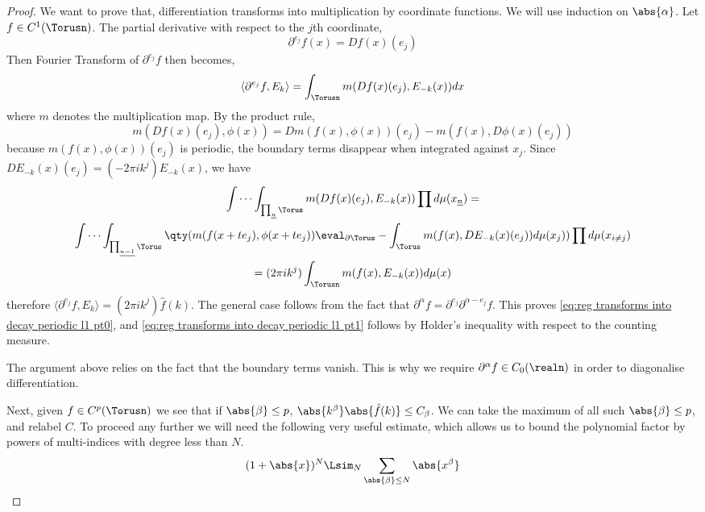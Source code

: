 \documentclass[../main-v2-manifolds.tex]{subfiles}
\begin{document}
\begin{proof}
    We want to prove that, differentiation transforms into multiplication by coordinate functions. We will use induction on $\abs{\alpha}$. Let $f\in C^1(\Torusn)$. The partial derivative with respect to the $j$th coordinate,
    \[
        \partial^{e_j}f(x) = Df(x)(e_j)
    \]
    Then Fourier Transform of $\partial^{e_j}f$ then becomes,
    \[
        \langle \partial^{e_j}f,E_k\rangle = \int_{\Torusn} m(Df(x)(e_j), E_{-k}(x))dx
    \]
    where $m$ denotes the multiplication map. By the product rule,
    \[
        m(Df(x)(e_j), \phi(x)) = Dm(f(x),\phi(x))(e_j) - m(f(x), D\phi(x)(e_j))
    \]
    because $m(f(x), \phi(x))(e_j)$ is periodic, the boundary terms disappear when integrated against $x_j$. Since $D E_{-k}(x)(e_j) = (-2\pi i k^j) E_{-k}(x)$, we have
    \begin{multline}
        \idotsint_{\prod_{\underline{n}}\Torus} m(Df(x)(e_j),E_{-k}(x))\prod d\mu(x_{\underline{n}}) 
        = \\  \idotsint_{\prod_{\underline{n-1}}\Torus} \qty(m(f(x+te_j),\phi(x+te_j))\eval_{\partial\Torus} - \int_\Torus m(f(x), DE_{-k}(x)(e_j)) d\mu(x_j)) \prod d\mu(x_{i\neq j})\\
        =(2\pi i k^j)\int_{\Torusn} m(f(x), E_{-k}(x))d\mu(x)
    \end{multline}
    therefore $\langle \partial^{e_j}f, E_k\rangle = (2\pi i k^j)\hat{f}(k)$. The general case follows from the fact that $\partial^{\alpha}f = \partial^{e_j}\partial^{\alpha-e_j}f$. This proves \cref{eq:reg transforms into decay periodic l1 pt0}, and \cref{eq:reg transforms into decay periodic l1 pt1} follows by Holder's inequality with respect to the counting measure.
    \begin{remark}
        The argument above relies on the fact that the boundary terms vanish. This is why we require $\partial^\alpha f\in C_0(\realn)$ in order to diagonalise differentiation.
    \end{remark}
    Next, given $f\in C^p(\Torusn)$ we see that if $\abs{\beta}\leq p$, $\abs{k^\beta}\abs{\hat{f}(k)}\leq C_{\beta}$. We can take the maximum of all such $\abs{\beta}\leq p$, and relabel $C$. To proceed any further we will need the following very useful estimate, which allows us to bound the polynomial factor by powers of multi-indices with degree less than $N$.
    \begin{equation}
        (1+\abs{x})^N\Lsim_N \sum_{\abs{\beta}\leq N}\abs{x^\beta}
        \label{eq: reg transinto decay small estimate}
    \end{equation}

\end{proof}
\end{document}
